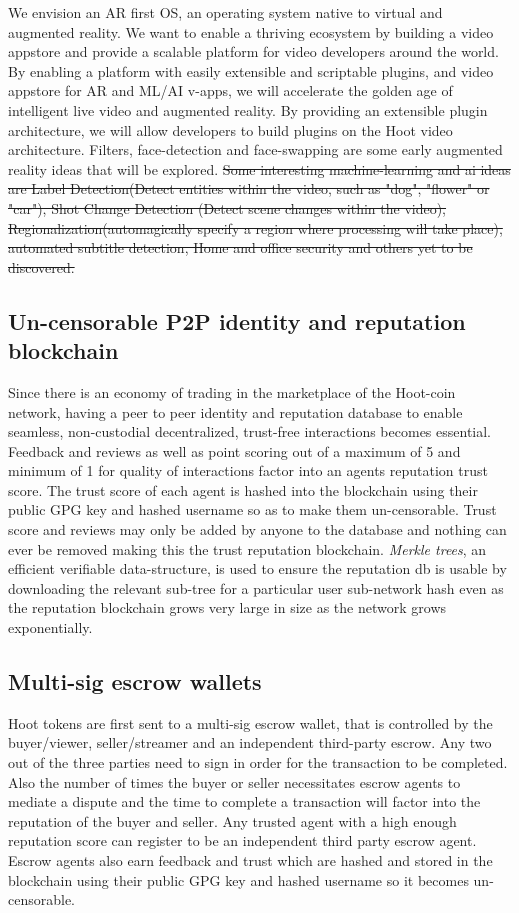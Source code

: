 \documentclass{article}
\begin{document}
We envision an AR first OS,  an operating system native to virtual and augmented reality.  We want to enable a thriving ecosystem by building a video appstore and provide a scalable
platform for video developers around the world. By enabling a platform with easily extensible and scriptable plugins, and video appstore for AR and ML/AI v-apps, we will accelerate the golden age of intelligent live video and augmented reality. By providing an extensible plugin architecture, we will allow developers to build plugins on the Hoot video architecture. Filters, face-detection and face-swapping
are some early augmented reality ideas that will be explored. 
\sout{Some interesting
machine-learning and ai ideas are Label Detection(Detect entities
within the video, such as "dog", "flower" or "car"), Shot Change
Detection (Detect scene changes within the video),
Regionalization(automagically specify a region where processing will
take place), automated subtitle detection, Home and office security and others yet to be discovered.} 

\subsection{Un-censorable P2P identity and reputation blockchain}
Since there is an economy of trading in the marketplace of the Hoot-coin network, having a peer to peer identity and reputation database to enable seamless, non-custodial decentralized, trust-free interactions becomes essential. Feedback and reviews as well as point scoring out of a maximum of 5 and minimum of 1 for quality of interactions factor into an agents reputation trust score. The trust score of each agent is hashed into the blockchain using their public GPG key and hashed username so as to make them un-censorable. Trust score and reviews may only be added by anyone to the database and nothing can ever be removed making this the trust reputation blockchain. \emph{Merkle trees}, an efficient verifiable data-structure, is used to ensure the reputation db is usable by downloading the relevant sub-tree for a particular user sub-network hash even as the reputation blockchain grows very large in size as the network grows exponentially.

\subsection{Multi-sig escrow wallets}
Hoot tokens are first sent to a multi-sig escrow wallet, that is controlled by the buyer/viewer, seller/streamer and an independent third-party escrow. Any
two out of the three parties need to sign in order for the transaction to be completed. Also the number of times the buyer or seller necessitates escrow agents to mediate a dispute and the time to complete a transaction will factor into the reputation of the buyer and seller. Any trusted agent with a high enough reputation score can register to be an independent third party escrow agent. Escrow agents also earn feedback and trust which are hashed and stored in the blockchain using their public GPG key and hashed username so it
becomes un-censorable.
\end{document}
